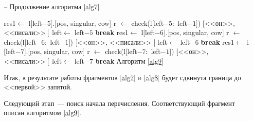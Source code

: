 \documentclass[main]{subfiles}
\begin{document}
\begin{algorithm}
	\caption{-- Продолжение алгоритма \ref{alg7}}\label{alg8}
	\begin{algorithmic}[1]
			\EndFor
		\State  res1$\gets$ l$[$left$-5]$.[pos, singular, cow]
			\State r $\gets$ check(l$[$left$-5:$ left$-1 ]$)
			\State \Return $[$<<он>>, <<писали>> $]$
			\State left$\gets$ left$-5$
		\State \textbf{break}
		\EndIf
			\EndIf
		\EndFor
		\State  res1$\gets$ l$[$left$-6]$.[pos, singular, cow]
		\State r $\gets$ check(l$[$left$-6:$ left$-1 ]$)
		\State \Return $[$<<он>>, <<писали>> $]$
		\State left$\gets$ left$-6$
		\State \textbf{break}
		\EndIf
		\EndIf
		\EndFor
		\State  res1$\gets$ l$[$left$-7]$.[pos, singular, cow]
		\State r $\gets$ check(l$[$left$-7:$ left$-1 ]$)
		\State \Return $[$<<он>>, <<писали>> $]$
		\State left$\gets$ left$-7$
		\State \textbf{break}
		\EndIf
		\EndIf
		\EndFor
		\Else \State Алгоритм \ref{alg9}
		\EndIf
			\EndWhile
	\end{algorithmic}
\end{algorithm}
\newpage

Итак, в результате работы фрагментов \ref{alg7} и \ref{alg8} будет сдвинута граница до <<первой>> запятой.

Следующий этап~--- поиск начала перечисления. Соответствующий фрагмент описан алгоритмом \ref{alg9}.
\end{document}
